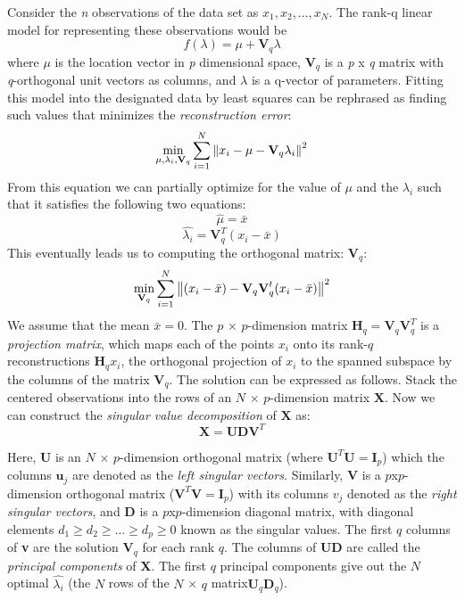 Consider the \emph{n} observations of the data set as $x_{1}, x_{2}, ... , x_{N}$. The rank-q linear model for representing these observations would be
\begin{equation} 
f(\lambda) = \mu + \textbf{V}_{q}\lambda
\end{equation}
where $\mu$ is the location vector in \emph{p} dimensional space, $\textbf{V}_{q}$ is a \emph{p} x \emph{q} matrix with \emph{q}-orthogonal unit vectors as columns, and $\lambda$ is a q-vector of parameters. Fitting this model into the designated data by least squares can be rephrased as finding such values that minimizes the \emph{reconstruction error}:
\begin{equation}
\min_{\mu, {\lambda_{i}}, \textbf{V}_{q}} \sum_{i=1}^{N}\left\lVert x_{i} - \mu - \textbf{V}_{q}\lambda_{i} \right\rVert^{2}
\end{equation}
From this equation we can partially optimize for the value of $\mu$ and the $\lambda_{i}$ such that it satisfies the following two equations:
\begin{equation}
\hat{\mu} = \bar{x}
\end{equation}
\begin{equation}
\hat{\lambda_{i}} = \textbf{V}_{q}^{T}(x_{i} - \bar{x})
\end{equation}
This eventually leads us to computing the orthogonal matrix: $\textbf{V}_{q}$:
\begin{equation}
\min_{\textbf{V}_{q}} \sum_{i=1}^{N}\left\lVert (x_{i} - \bar{x}) - \textbf{V}_{q}\textbf{V}_{q}^{t}(x_{i} - \bar{x}) \right\rVert^{2}
\end{equation}
We assume that the mean $\bar{x} = 0$. The $p$ × $p$-dimension matrix $\textbf{H}_{q} = \textbf{V}_{q}\textbf{V}_{q}^{T}$ is a \emph{projection matrix}, which maps each of the points $x_{i}$ onto its rank-$q$ reconstructions $\textbf{H}_{q}x_{i}$, the orthogonal projection of $x_{i}$ to the spanned subspace by the columns of the matrix $\textbf{V}_{q}$.
The solution can be expressed as follows. Stack the centered observations into the rows of an $N$ × $p$-dimension matrix $\textbf{X}$. Now we can construct the \emph{singular value decomposition} of $\textbf{X}$ as:
\begin{equation}
    \textbf{X} = \textbf{UDV}^{T}
\end{equation}

Here, \textbf{U} is an $N$ × $p$-dimension orthogonal matrix (where $\textbf{U}^{T}\textbf{U} = \textbf{I}_{p}$) which the columns $\textbf{u}_{j}$ are denoted as the \emph{left singular vectors}. Similarly, \textbf{V} is a $p$x$p$-dimension orthogonal matrix ($\textbf{V}^{T}\textbf{V} = \textbf{I}_{p}$) with its columns $v_{j}$ denoted as the \emph{right singular vectors}, and \textbf{D} is a $p$x$p$-dimension diagonal matrix, with diagonal elements $d_{1} \geq d_{2} \geq ... \geq d_{p} \geq 0$ known as the singular values. The first $q$ columns of \textbf{v} are the solution $\textbf{V}_{q}$ for each rank $q$. The columns of \textbf{UD} are called the \emph{principal components} of \textbf{X}. The first $q$ principal components give out the $N$ optimal $\hat{\lambda_{i}}$ (the $N$ rows of the $N$ × $q$ matrix$\textbf{U}_{q}\textbf{D}_{q}$).


